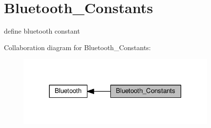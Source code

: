 \hypertarget{group__bluetooth___constants}{}\section{Bluetooth\+\_\+\+Constants}
\label{group__bluetooth___constants}


define bluetooth constant  


Collaboration diagram for Bluetooth\+\_\+\+Constants\+:\nopagebreak
\begin{figure}[H]
\begin{center}
\leavevmode
\includegraphics[width=282pt]{d2/d60/group__bluetooth___constants}
\end{center}
\end{figure}
